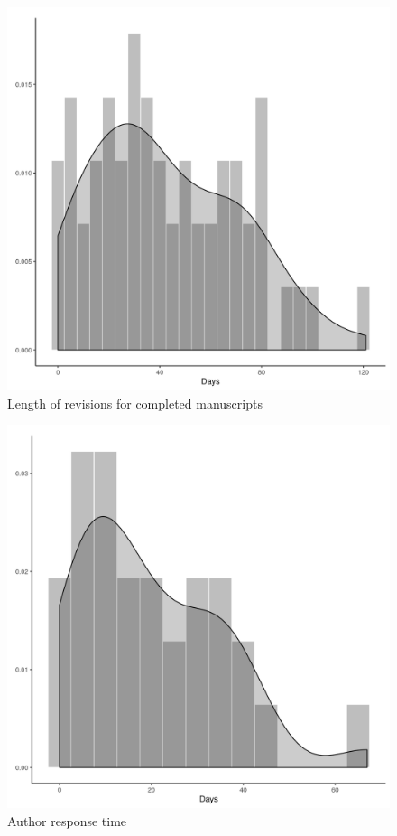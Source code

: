 \documentclass[PP]{AEA}
\begin{document}
\begin{figure}
    \centering
    \includegraphics[height=0.4\textheight]{images/total_length_hist.png}
    \caption{Length of revisions for completed manuscripts}
    \label{fig:pre:revision_length}
\end{figure}




\begin{figure}
    \centering
    \includegraphics[height=0.4\textheight]{images/author_response_hist.png}
    \caption{Author response time}
    \label{fig:pre:author_response_time}
\end{figure}
\end{document}
